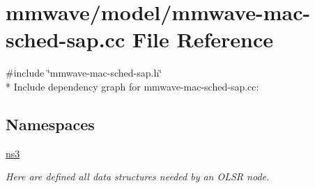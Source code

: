 \hypertarget{mmwave-mac-sched-sap_8cc}{}\section{mmwave/model/mmwave-\/mac-\/sched-\/sap.cc File Reference}
\label{mmwave-mac-sched-sap_8cc}
{\ttfamily \#include \char`\"{}mmwave-\/mac-\/sched-\/sap.\+h\char`\"{}}\\*
Include dependency graph for mmwave-\/mac-\/sched-\/sap.cc\+:
\subsection*{Namespaces}
\begin{DoxyCompactItemize}
\item 
 \hyperlink{namespacens3}{ns3}
\begin{DoxyCompactList}\small\item\em Here are defined all data structures needed by an O\+L\+SR node. \end{DoxyCompactList}\end{DoxyCompactItemize}
